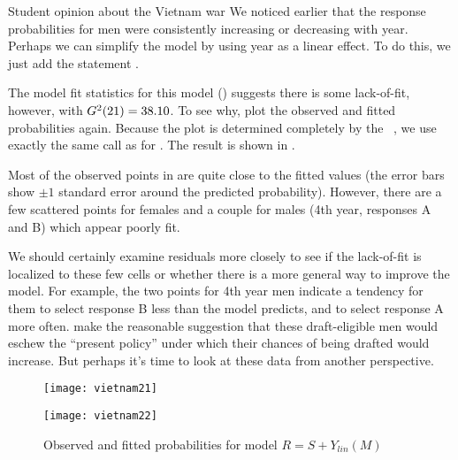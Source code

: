 \begin{Example}[vietnam1]{Student opinion about the Vietnam war}
We noticed earlier that the response probabilities for men were consistently
increasing or decreasing with year.  Perhaps we can simplify the model
by using year as a linear effect.  To do this, we just add the statement
.


The model fit statistics for this model ()
suggests there is some lack-of-fit, however, with $G^2 (21) = 38.10$.
To see why, plot the observed and fitted probabilities again.
Because the plot is determined completely by the \ODS\ ,
we use exactly the same  call as for .
The result is shown in .
\begin{Output}[htb]
\caption{Vietnam war data, Linear year effect for males}\label{out:vietnam2.1}
\small

\end{Output}

Most of the observed points in  are quite close to
the fitted values (the error bars show $\pm 1$ standard error
around the predicted probability). However, there are a few scattered points for
females and a couple for males (4th year, responses A and B) which appear poorly fit.

We should certainly examine residuals more closely
to see if the lack-of-fit is localized to these few cells
or whether there is a more general way to improve the model.
For example,  the two points for 4th year men
indicate a tendency for them to select response B less than the model predicts, and to select
response A more often.
 \citet{Aitkin-etal:89} make the reasonable
suggestion that these draft-eligible men would eschew the ``present policy''
under which their chances of being drafted would increase.
But perhaps it's time to look at these data from another perspective.

\begin{figure}[htb]
 \begin{minipage}[t]{.49\linewidth}
  \texttt{[image: vietnam21]}
 \end{minipage}%
 \hfill
 \begin{minipage}[t]{.49\linewidth}
  \texttt{[image: vietnam22]}
 \end{minipage}
 \caption{Observed and fitted probabilities for model $R = S + Y_{lin}(M)$}\label{fig:vietnam2}
\end{figure}
\end{Example}
